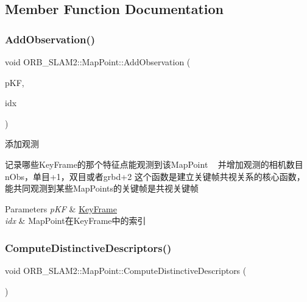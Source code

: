 \subsection{Member Function Documentation}
\mbox{\label{class_o_r_b___s_l_a_m2_1_1_map_point_a37277ee3c7d8657976e749ab920bb13f}} 
\subsubsection{\texorpdfstring{Add\+Observation()}{AddObservation()}}
{\footnotesize\ttfamily void O\+R\+B\+\_\+\+S\+L\+A\+M2\+::\+Map\+Point\+::\+Add\+Observation (\begin{DoxyParamCaption}\item[{\mbox{\hyperlink{class_o_r_b___s_l_a_m2_1_1_key_frame}{Key\+Frame}} $\ast$}]{p\+KF,  }\item[{size\+\_\+t}]{idx }\end{DoxyParamCaption})}



添加观测 

记录哪些\+Key\+Frame的那个特征点能观测到该\+Map\+Point ~\newline
并增加观测的相机数目n\+Obs，单目+1，双目或者grbd+2 这个函数是建立关键帧共视关系的核心函数，能共同观测到某些\+Map\+Points的关键帧是共视关键帧 
\begin{DoxyParams}{Parameters}
{\em p\+KF} & \mbox{\hyperlink{class_o_r_b___s_l_a_m2_1_1_key_frame}{Key\+Frame}} \\
\hline
{\em idx} & Map\+Point在\+Key\+Frame中的索引 \\
\hline
\end{DoxyParams}
\mbox{\label{class_o_r_b___s_l_a_m2_1_1_map_point_ab4c3dfd8f5f05a4b1888021f1fac3d84}} 
\subsubsection{\texorpdfstring{Compute\+Distinctive\+Descriptors()}{ComputeDistinctiveDescriptors()}}
{\footnotesize\ttfamily void O\+R\+B\+\_\+\+S\+L\+A\+M2\+::\+Map\+Point\+::\+Compute\+Distinctive\+Descriptors (\begin{DoxyParamCaption}{ }\end{DoxyParamCaption})}



